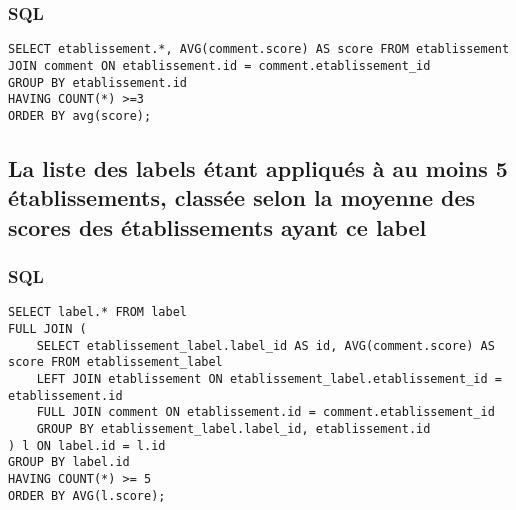 \subsubsection{SQL}
\begin{lstlisting}
SELECT etablissement.*, AVG(comment.score) AS score FROM etablissement 
JOIN comment ON etablissement.id = comment.etablissement_id 
GROUP BY etablissement.id 
HAVING COUNT(*) >=3 
ORDER BY avg(score);
\end{lstlisting}

\subsection{La liste des labels étant appliqués à au moins 5 établissements, classée selon la moyenne des scores des établissements ayant ce label}
\subsubsection{SQL}
\begin{lstlisting}
SELECT label.* FROM label 
FULL JOIN (
    SELECT etablissement_label.label_id AS id, AVG(comment.score) AS score FROM etablissement_label 
    LEFT JOIN etablissement ON etablissement_label.etablissement_id = etablissement.id 
    FULL JOIN comment ON etablissement.id = comment.etablissement_id 
    GROUP BY etablissement_label.label_id, etablissement.id
) l ON label.id = l.id 
GROUP BY label.id 
HAVING COUNT(*) >= 5 
ORDER BY AVG(l.score);
\end{lstlisting}
